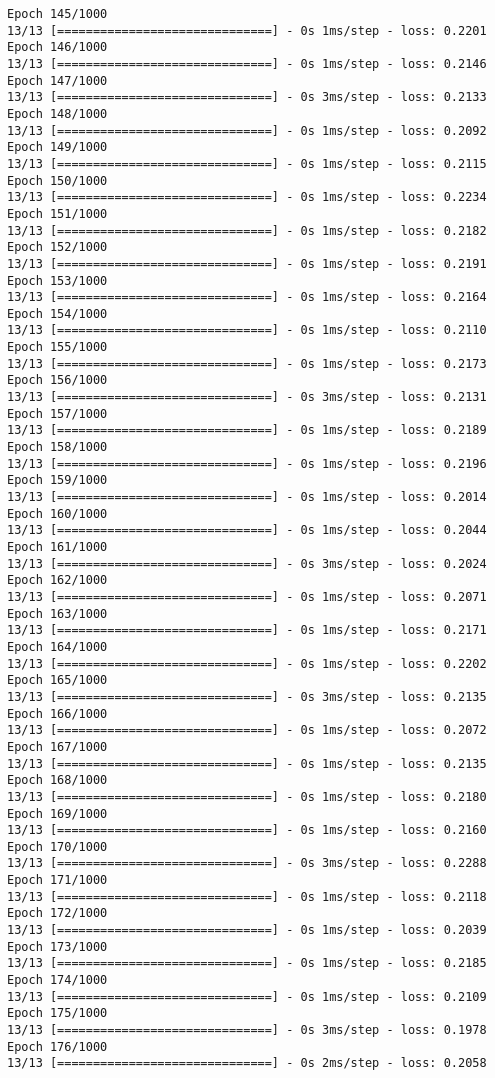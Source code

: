 \documentclass[11pt]{article}
\begin{document}
\begin{Verbatim}[commandchars=\\\{\}]
Epoch 145/1000
13/13 [==============================] - 0s 1ms/step - loss: 0.2201
Epoch 146/1000
13/13 [==============================] - 0s 1ms/step - loss: 0.2146
Epoch 147/1000
13/13 [==============================] - 0s 3ms/step - loss: 0.2133
Epoch 148/1000
13/13 [==============================] - 0s 1ms/step - loss: 0.2092
Epoch 149/1000
13/13 [==============================] - 0s 1ms/step - loss: 0.2115
Epoch 150/1000
13/13 [==============================] - 0s 1ms/step - loss: 0.2234
Epoch 151/1000
13/13 [==============================] - 0s 1ms/step - loss: 0.2182
Epoch 152/1000
13/13 [==============================] - 0s 1ms/step - loss: 0.2191
Epoch 153/1000
13/13 [==============================] - 0s 1ms/step - loss: 0.2164
Epoch 154/1000
13/13 [==============================] - 0s 1ms/step - loss: 0.2110
Epoch 155/1000
13/13 [==============================] - 0s 1ms/step - loss: 0.2173
Epoch 156/1000
13/13 [==============================] - 0s 3ms/step - loss: 0.2131
Epoch 157/1000
13/13 [==============================] - 0s 1ms/step - loss: 0.2189
Epoch 158/1000
13/13 [==============================] - 0s 1ms/step - loss: 0.2196
Epoch 159/1000
13/13 [==============================] - 0s 1ms/step - loss: 0.2014
Epoch 160/1000
13/13 [==============================] - 0s 1ms/step - loss: 0.2044
Epoch 161/1000
13/13 [==============================] - 0s 3ms/step - loss: 0.2024
Epoch 162/1000
13/13 [==============================] - 0s 1ms/step - loss: 0.2071
Epoch 163/1000
13/13 [==============================] - 0s 1ms/step - loss: 0.2171
Epoch 164/1000
13/13 [==============================] - 0s 1ms/step - loss: 0.2202
Epoch 165/1000
13/13 [==============================] - 0s 3ms/step - loss: 0.2135
Epoch 166/1000
13/13 [==============================] - 0s 1ms/step - loss: 0.2072
Epoch 167/1000
13/13 [==============================] - 0s 1ms/step - loss: 0.2135
Epoch 168/1000
13/13 [==============================] - 0s 1ms/step - loss: 0.2180
Epoch 169/1000
13/13 [==============================] - 0s 1ms/step - loss: 0.2160
Epoch 170/1000
13/13 [==============================] - 0s 3ms/step - loss: 0.2288
Epoch 171/1000
13/13 [==============================] - 0s 1ms/step - loss: 0.2118
Epoch 172/1000
13/13 [==============================] - 0s 1ms/step - loss: 0.2039
Epoch 173/1000
13/13 [==============================] - 0s 1ms/step - loss: 0.2185
Epoch 174/1000
13/13 [==============================] - 0s 1ms/step - loss: 0.2109
Epoch 175/1000
13/13 [==============================] - 0s 3ms/step - loss: 0.1978
Epoch 176/1000
13/13 [==============================] - 0s 2ms/step - loss: 0.2058

\end{Verbatim}
\end{document}
